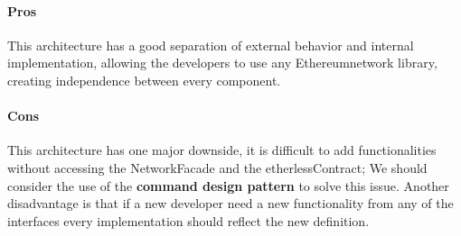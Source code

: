 \paragraph{Pros}
This architecture has a good separation of external behavior and internal implementation,
allowing the developers to use any Ethereum\glo network library, creating independence between every component.
\paragraph{Cons}
This architecture has one major downside, it is difficult to add functionalities without accessing the NetworkFacade and the etherlessContract; We should consider the use of the \textbf{command design pattern} to solve this issue.
Another disadvantage is that if a new developer need a new functionality from any of the interfaces every implementation should reflect the new definition.
